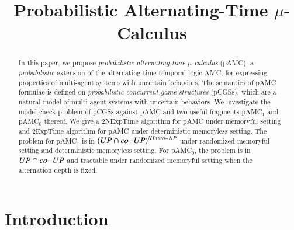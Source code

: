 \documentclass[letterpaper]{article}
\newcommand{\pamc}{{pAMC}\xspace}
\newcommand{\pamcs}{{pAMC$_0$}\xspace}
\newcommand{\pamcc}{{pAMC$_1$}\xspace}
\begin{document}
\title{Probabilistic Alternating-Time $\mu$-Calculus}
 \author{%
 }

\maketitle

\begin{abstract}
In this paper, we propose \emph{probabilistic alternating-time $\mu$-calculus} (\pamc), a \emph{probabilistic} extension of the alternating-time temporal logic AMC, for expressing properties of multi-agent systems with uncertain behaviors.
The semantics of \pamc formulae is defined on \emph{probabilistic concurrent game structures} (pCGSs), which are a natural model of multi-agent systems with uncertain behaviors. We investigate the model-check problem of pCGSs against \pamc and two useful fragments \pamcc and \pamcs thereof.
We give a {\sc 2NExpTime} algorithm
for \pamc under memoryful setting and {\sc 2ExpTime} algorithm for \pamc under deterministic memoryless setting.
The problem for \pamcc is in $({\sc UP\cap co{-}UP})^{{\sc NP\cap co{-}NP}}$ under randomized memoryful setting and
deterministic memoryless setting.
For \pamcs, the problem is in ${\sc UP\cap co{-}UP}$ and tractable under randomized memoryful setting when the alternation depth is fixed.
\end{abstract}



\section{Introduction}
\label{sec:intr}
\end{document}
